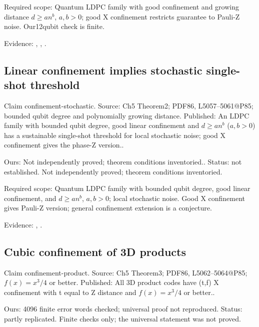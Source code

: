 Required scope: Quantum LDPC family with good confinement and growing distance $d\ge a n^b$, $a,b>0$; good X confinement restricts guarantee to Pauli-Z noise. Our12qubit check is finite.

Evidence: \href{https://github.com/alectionary/vibe-math/blob/master/formalization/quintavalle-hgp/sources/browser-extraction.txt}{}, \href{https://github.com/alectionary/vibe-math/blob/master/formalization/quintavalle-hgp/availability.md}{}, \href{https://github.com/alectionary/vibe-math/blob/master/formalization/quintavalle-hgp/results/exact_checks.json}{}.
\subsection{Linear confinement implies stochastic single-shot threshold}\label{claim:confinement-stochastic}
Claim confinement-stochastic. Source: Ch5 Theorem2; PDF86, L5057--5061@P85; bounded qubit degree and polynomially growing distance. Published: An LDPC family with bounded qubit degree, good linear confinement and $d\ge a n^b$ ($a,b>0$) has a sustainable single-shot threshold for local stochastic noise; good X confinement gives the phase-Z version..

Ours: Not independently proved; theorem conditions inventoried.. Status: not established. Not independently proved; theorem conditions inventoried.

Required scope: Quantum LDPC family with bounded qubit degree, good linear confinement, and $d\ge a n^b$, $a,b>0$; local stochastic noise. Good X confinement gives Pauli-Z version; general confinement extension is a conjecture.

Evidence: \href{https://github.com/alectionary/vibe-math/blob/master/formalization/quintavalle-hgp/sources/browser-extraction.txt}{}, \href{https://github.com/alectionary/vibe-math/blob/master/formalization/quintavalle-hgp/availability.md}{}.
\subsection{Cubic confinement of 3D products}\label{claim:confinement-product}
Claim confinement-product. Source: Ch5 Theorem3; PDF86, L5062--5064@P85; $f(x)=x^3/4$ or better. Published: All 3D product codes have (t,f) X confinement with t equal to Z distance and $f(x)=x^3/4$ or better..

Ours: 4096 finite error words checked; universal proof not reproduced. Status: partly replicated. Finite checks only; the universal statement was not proved.

